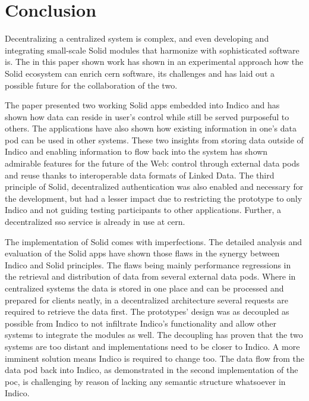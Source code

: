 \chapter{Conclusion}

Decentralizing a centralized system is complex, and even developing and integrating small-scale Solid modules that harmonize with sophisticated software is. The in this paper shown work has shown in an experimental approach how the Solid ecosystem can enrich \gls{cern} software, its challenges and has laid out a possible future for the collaboration of the two.

The paper presented two working Solid apps embedded into Indico and has shown how data can reside in user's control while still be served purposeful to others. The applications have also shown how existing information in one's data pod can be used in other systems. These two insights from storing data outside of Indico and enabling information to flow back into the system has shown admirable features for the future of the Web: control through external data pods and reuse thanks to interoperable data formats of Linked Data. The third principle of Solid, decentralized authentication was also enabled and necessary for the development, but had a lesser impact due to restricting the prototype to only Indico and not guiding testing participants to other applications. Further, a decentralized \gls{sso} service is already in use at \gls{cern}.

The implementation of Solid comes with imperfections. The detailed analysis and evaluation of the Solid apps have shown those flaws in the synergy between Indico and Solid principles. The flaws being mainly performance regressions in the retrieval and distribution of data from several external data pods. Where in centralized systems the data is stored in one place and can be processed and prepared for clients neatly, in a decentralized architecture several requests are required to retrieve the data first. The prototypes' design was as decoupled as possible from Indico to not infiltrate Indico's functionality and allow other systems to integrate the modules as well. The decoupling has proven that the two systems are too distant and implementations need to be closer to Indico. A more imminent solution means Indico is required to change too. The data flow from the data pod back into Indico, as demonstrated in the second implementation of the \gls{poc}, is challenging by reason of lacking any semantic structure whatsoever in Indico.

